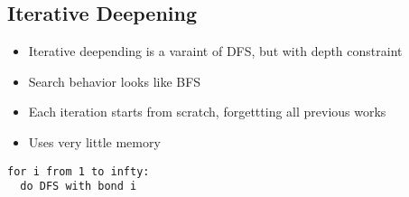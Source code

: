   \subsection{Iterative Deepening}

    \begin{itemize}
      \item Iterative deepending is a varaint of DFS, but with depth constraint
      \item Search behavior looks like BFS
      \item Each iteration starts from scratch, forgettting all previous works
      \item Uses very little memory
    \end{itemize}

    \begin{lstlisting}[style=pseudo]
for i from 1 to infty:
  do DFS with bond i
    \end{lstlisting}